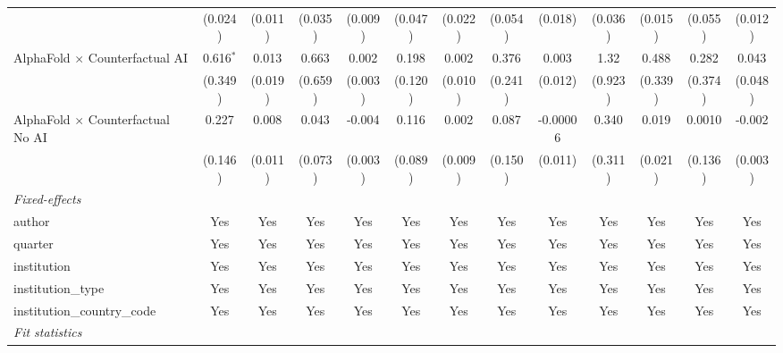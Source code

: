 \begin{tabular}{lcccccccccccc}
                                            & (0.024)       & (0.011)       & (0.035)       & (0.009) & (0.047)     & (0.022)       & (0.054) & (0.018)       & (0.036) & (0.015) & (0.055)      & (0.012)\\   
   AlphaFold $\times$ Counterfactual AI     & 0.616$^{*}$   & 0.013         & 0.663         & 0.002   & 0.198       & 0.002         & 0.376   & 0.003         & 1.32    & 0.488   & 0.282        & 0.043\\   
                                            & (0.349)       & (0.019)       & (0.659)       & (0.003) & (0.120)     & (0.010)       & (0.241) & (0.012)       & (0.923) & (0.339) & (0.374)      & (0.048)\\   
   AlphaFold $\times$ Counterfactual No AI  & 0.227         & 0.008         & 0.043         & -0.004  & 0.116       & 0.002         & 0.087   & -0.00006      & 0.340   & 0.019   & 0.0010       & -0.002\\   
                                            & (0.146)       & (0.011)       & (0.073)       & (0.003) & (0.089)     & (0.009)       & (0.150) & (0.011)       & (0.311) & (0.021) & (0.136)      & (0.003)\\   
   \midrule
   \emph{Fixed-effects}\\
   author                                   & Yes           & Yes           & Yes           & Yes     & Yes         & Yes           & Yes     & Yes           & Yes     & Yes     & Yes          & Yes\\  
   quarter                                  & Yes           & Yes           & Yes           & Yes     & Yes         & Yes           & Yes     & Yes           & Yes     & Yes     & Yes          & Yes\\  
   institution                              & Yes           & Yes           & Yes           & Yes     & Yes         & Yes           & Yes     & Yes           & Yes     & Yes     & Yes          & Yes\\  
   institution\_type                        & Yes           & Yes           & Yes           & Yes     & Yes         & Yes           & Yes     & Yes           & Yes     & Yes     & Yes          & Yes\\  
   institution\_country\_code               & Yes           & Yes           & Yes           & Yes     & Yes         & Yes           & Yes     & Yes           & Yes     & Yes     & Yes          & Yes\\  
   \midrule
   \emph{Fit statistics}\\

\end{tabular}
